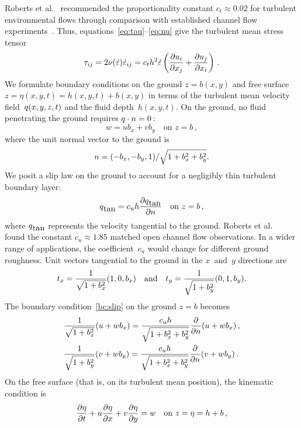 \documentclass[a5paper,12pt]{article}
\newcommand{\ros}{{\dot\varepsilon}}
\renewcommand{\vec}[1]{\text{\boldmath$#1$}}
\begin{document}
Roberts et al.~\cite{Roberts2008} recommended the proportionality constant $c_t\approx0.02$ for turbulent environmental flows through comparison with established channel flow experiments~\cite[e.g.]{Nezu2005}.
Thus, equations~\eqref{eq:tau}--\eqref{eq:nu} give the turbulent mean stress tensor
\begin{equation}
\tau_{ij}=2\nu(\ros)\ros_{ij}=c_th^2\ros\left( \D{x_j}{u_i} +\D{x_i}{u_j}\right) \,.\label{eq:stress}
\end{equation}
We formulate boundary conditions on the ground $z=b(x,y)$ and free surface $z=\eta(x,y,t)=h(x,y,t)+b(x,y)$ in terms of the turbulent mean velocity field~$\vec q(x,y,z,t)$ and the fluid depth~$h(x,y,t)$. 
On the ground, no fluid penetrating the ground requires $\vec q\cdot\vec n=0$\,:
\begin{equation}
w=ub_x+vb_y \quad\text{on } z=b\,,
\label{eq:nopen}
\end{equation}
where the unit normal vector to the ground is
\begin{equation}
\vec n=(-b_x,-b_y,1)/\sqrt{1+b_x^2+b_y^2}.
\label{eq:vecn}
\end{equation} 
We posit a slip law on the ground to account for a negligibly thin turbulent boundary layer:
\begin{equation}
\vec q_{\text{tan}}=c_uh\frac{\partial\vec q_{\text{tan}}}{\partial n} \quad\text{on } z=b\,,
\label{bc:slip}
\end{equation} 
where $\vec q_{\text{tan}}$ represents the velocity tangential to the ground. 
Roberts et al.~\cite{Roberts2008} found the constant $c_u\approx1.85$ matched open channel flow observations. 
In a wider range of applications, the coefficient~$c_u$ would change for different ground roughness. 
Unit vectors tangential to the ground in the $x$~and~$y$ directions are
\begin{equation*}
\vec t_x=\frac{1}{\sqrt{1+b_x^2}}(1,0,b_x)
\quad\text{and}\quad
\vec t_y=\frac{1}{\sqrt{1+b_y^2}}(0,1,b_y).
\end{equation*}
The boundary condition~\eqref{bc:slip} on the ground \(z=b\) becomes
\begin{align}&
\frac{1}{\sqrt{1+b_x^2}}(u+wb_x)=\frac{c_uh}{\sqrt{1+b_x^2+b_y^2}}\D n{}(u+wb_x)\,,\label{slip:u}\\&
\frac{1}{\sqrt{1+b_y^2}}(v+wb_y)=\frac{c_uh}{\sqrt{1+b_x^2+b_y^2}}\D n{}(v+wb_y)\,.\label{slip:v}
\end{align}
On the free surface (that is, on its turbulent mean position), the kinematic condition is 
\begin{equation}
 \D{t}{\eta}+u\D{x}{\eta}+v\D{y}{\eta}=w \quad\text{on } z=\eta=h+b\,,
\end{equation}
\end{document}
